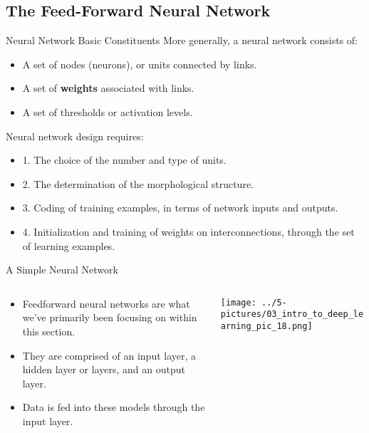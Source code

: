 \documentclass[11pt]{beamer}
\begin{document}
\subsection{The Feed-Forward Neural Network}
%
\begin{frame}{Neural Network Basic Constituents}
More generally, a neural network consists of:
	\begin{itemize}
		\item A set of nodes (neurons), or units connected by links.
		\item A set of \textbf{weights} associated with links.
		\item A set of thresholds or activation levels.
\end{itemize}
Neural network design requires:
\begin{itemize}
		\item 1. The choice of the number and type of units.
		\item 2. The determination of the morphological structure.
		\item 3. Coding of training examples, in terms of network inputs and outputs.
		\item 4. Initialization and training of weights on interconnections, through the set of learning examples.
	\end{itemize}
\end{frame}
\begin{frame}{A Simple Neural Network}
\begin{columns}[T] %
\begin{column}{.48\textwidth}
\begin{itemize}
		\item Feedforward neural networks are what we’ve primarily been focusing on within this section. 
		
		\item They are comprised of an input layer, a hidden layer or layers, and an output layer. 
		
		\item Data is fed into these models through the input layer.  
		
\end{itemize}
\end{column}%
\hfill%
\begin{column}{.48\textwidth}
        \texttt{[image: ../5-pictures/03\_intro\_to\_deep\_learning\_pic\_18.png]}
\end{column}%
\end{columns}
\end{frame}
\end{document}
